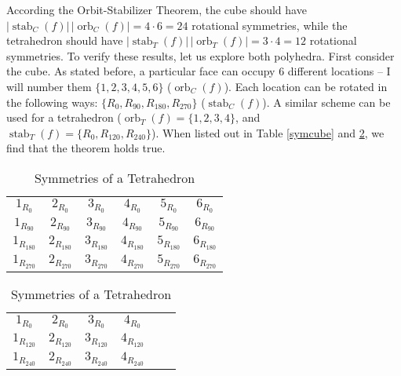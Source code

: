 \documentclass[11pt,twoside]{article}
\begin{document}
According the Orbit-Stabilizer Theorem, the cube should have $|\operatorname{stab}_{C}(f)|\, |\operatorname{orb}_{C}(f)| = 4 \cdot 6 = 24$ rotational symmetries, while the tetrahedron should have $|\operatorname{stab}_{T}(f)|\, |\operatorname{orb}_{T}(f)| = 3 \cdot 4 = 12$ rotational symmetries.  To verify these results, let us explore both polyhedra.  First consider the cube.  As stated before, a particular face can occupy $6$ different locations -- I will number them $\{ 1,2,3,4,5,6 \}$ ($\operatorname{orb}_{C}(f)$).  Each location can be rotated in the following ways: $\{ R_0, R_{90}, R_{180}, R_{270} \}$ ($\operatorname{stab}_{C}(f)$).  A similar scheme can be used for a tetrahedron ($\operatorname{orb}_{T}(f) = \{ 1,2,3,4 \}$, and $\operatorname{stab}_{T}(f) = \{ R_0, R_{120}, R_{240} \}$).  When listed out in Table \ref{symcube} and \ref{symtet}, we find that the theorem holds true.
\begin{table}[H]
    \begin{minipage}{.5\linewidth}
\centering
\begin{tabular}{| c | c | c | c | c | c |}
\hline
$1_{R_{0}}$     &  $2_{R_{0}}$     &  $3_{R_{0}}$     &  $4_{R_{0}}$     &  $5_{R_{0}}$     &  $6_{R_{0}}$  \\
$1_{R_{90}}$   &  $2_{R_{90}}$   &  $3_{R_{90}}$   &  $4_{R_{90}}$   &  $5_{R_{90}}$    &  $6_{R_{90}}$  \\
$1_{R_{180}}$ &  $2_{R_{180}}$ &  $3_{R_{180}}$  &  $4_{R_{180}}$ &  $5_{R_{180}}$  &  $6_{R_{180}}$ \\
$1_{R_{270}}$ &  $2_{R_{270}}$ &  $3_{R_{270}}$  &  $4_{R_{270}}$ &  $5_{R_{270}}$  &  $6_{R_{270}}$  \\\hline
\end{tabular}\vspace{2mm}
\caption{Symmetries of a Cube}
\label{symcube}
\end{minipage}%
\begin{minipage}{.5\linewidth}
\centering
\begin{tabular}{| c | c | c | c | c | c |}
\hline
$1_{R_{0}}$     &  $2_{R_{0}}$     &  $3_{R_{0}}$     &  $4_{R_{0}}$  \\
$1_{R_{120}}$   &  $2_{R_{120}}$   &  $3_{R_{120}}$   &  $4_{R_{120}}$  \\
$1_{R_{240}}$ &  $2_{R_{240}}$ &  $3_{R_{240}}$  &  $4_{R_{240}}$  \\\hline
\end{tabular}\vspace{2mm}
\caption{Symmetries of a Tetrahedron}
\label{symtet}
\end{minipage}
\end{table}
\end{document}
